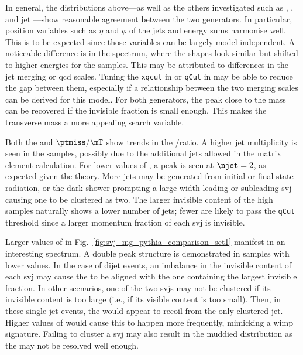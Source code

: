 In general, the distributions above---as well as the others investigated such as \ptmiss, \mht, and \gls{jet} \pt---show reasonable agreement between the two generators. In particular, position variables such as $\eta$ and $\phi$ of the \glspl{jet} and energy sums harmonise well. This is to be expected since those variables can be largely model-independent. A noticeable difference is in the \mT spectrum, where the shapes look similar but shifted to higher energies for the \MADGRAPH samples. This may be attributed to differences in the jet merging or \acrshort{qcd} scales. Tuning the \texttt{xqcut} in \MADGRAPH or \texttt{qCut} in \PYTHIA may be able to reduce the gap between them, especially if a relationship between the two merging scales can be derived for this model. For both generators, the peak close to the \PZprime mass can be recovered if the invisible fraction is small enough. This makes the transverse mass a more appealing search variable.

Both the \njet and $\ptmiss/\mT$ show trends in the \MADGRAPH/\PYTHIA ratio. A higher \gls{jet} multiplicity is seen in the \MADGRAPH samples, possibly due to the additional \glspl{jet} allowed in the matrix element calculation. For lower values of \rinv, a peak is seen at $\njet = \text{2}$, as expected given the theory. More \glspl{jet} may be generated from initial or final state radiation, or the dark shower prompting a large-width leading or subleading \gls{svj} causing one to be clustered as two. The larger invisible content of the high \rinv samples naturally shows a lower number of \glspl{jet}; fewer are likely to pass the \texttt{qCut} threshold since a larger momentum fraction of each \gls{svj} is invisible.

Larger values of \rinv in Fig.~\ref{fig:svj_mg_pythia_comparison_set1} manifest in an interesting \mindphi spectrum. A double peak structure is demonstrated in samples with lower values. In the case of dijet events, an imbalance in the invisible content of each \gls{svj} may cause the \ptmiss to be aligned with the one containing the largest invisible fraction. In other scenarios, one of the two \glspl{svj} may not be clustered if its invisible content is too large (i.e., if its visible content is too small). Then, in these single \gls{jet} events, the \ptmiss would appear to recoil from the only clustered jet. Higher values of \rinv would cause this to happen more frequently, mimicking a \acrshort{wimp} signature. Failing to cluster a \gls{svj} may also result in the muddied \mT distribution as the \ptvecmiss may not be resolved well enough.

